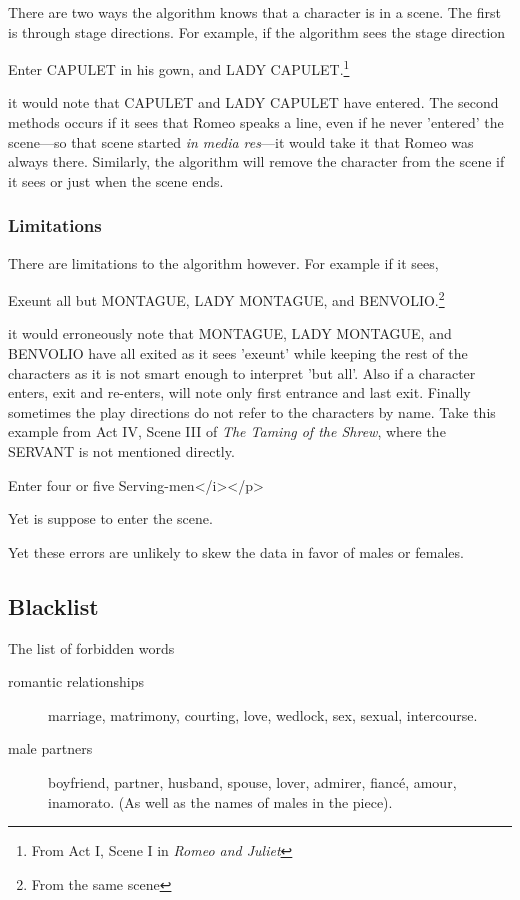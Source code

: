 \documentclass[12pt]{article}
\begin{document}
There are two ways the algorithm knows that a character is in a scene. The
first is through stage directions. For example, if the algorithm sees the stage
direction 
\begin{displayquote}
Enter CAPULET in his gown, and LADY CAPULET.\footnote{From Act
    I, Scene I in \emph{Romeo and Juliet}}
\end{displayquote}
it would note that CAPULET and LADY CAPULET have entered. The second methods
occurs if it sees that Romeo speaks a line, even if he never 'entered' the
scene---so that scene started \textit{in media res}---it would take it that
Romeo was always there. Similarly, the algorithm will remove the character from
the scene if it sees  or just when the scene ends.

\subsubsection{Limitations}
\label{ssub:limitations}

There are limitations to the algorithm however. For example if it sees,
\begin{displayquote}
Exeunt all but MONTAGUE, LADY MONTAGUE, and BENVOLIO.\footnote{From
the same scene}
\end{displayquote}
it would erroneously note that MONTAGUE, LADY MONTAGUE, and BENVOLIO have all
exited as it sees 'exeunt' while keeping the rest of the characters as it is
not smart enough to interpret 'but all'. Also if a character enters, exit and
re-enters, will note only first entrance and last exit. Finally sometimes the
play directions do not refer to the characters by name. Take this example
from Act IV, Scene III of \emph{The Taming of the Shrew}, where the SERVANT is
not mentioned directly.
\begin{displayquote}
Enter four or five Serving-men</i></p>
\end{displayquote}
Yet is suppose to enter the scene.  

Yet these errors are unlikely to skew the data in favor of males or females.

\subsection{Blacklist}
\label{sub:blacklist}

The list of forbidden words 
\begin{description}
    \item[romantic relationships] marriage,
        matrimony, courting, love, wedlock, sex, sexual, intercourse.
    \item[male partners] boyfriend, partner, husband, spouse, lover,
        admirer, fiancé, amour, inamorato. (As well as the names of males in
        the piece).
\end{description}
\end{document}
